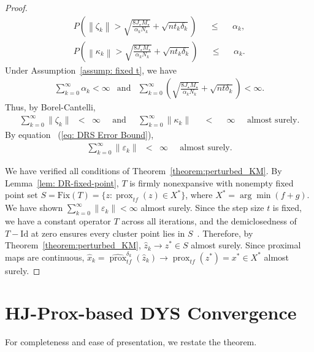 \documentclass{article}
\newcommand{\prox}{\operatorname{prox}}
\newcommand{\amp}{\mathop{\:\:\,}\nolimits}
\theoremstyle{plain}
\theoremstyle{definition}
\theoremstyle{remark}
\begin{document}
\begin{proof}
\begin{eqnarray}
    P\left(\left\|\zeta_k\right\| > \sqrt{\frac{8J_\star M_\star}{\alpha_k N_k}} +\sqrt{nt_k\delta_k}\right) \amp \leq \amp \alpha_k,\\
    P\left(\left\|\kappa_k\right\| > \sqrt{\frac{8J_\star M_\star}{\alpha_k N_k}} +\sqrt{nt_k\delta_k}\right) \amp \leq \amp \alpha_k.
\end{eqnarray}
Under Assumption~\ref{assump: fixed t}, we have
\begin{eqnarray}
    \sum_{k=0}^\infty \alpha_k < \infty &\text{and}& \sum_{k=0}^\infty \left(\sqrt{\frac{8J_\star M_\star}{\alpha_k N_k}}+\sqrt{nt\delta_k}\right)< \infty.
\end{eqnarray}
Thus, by Borel-Cantelli, 
\begin{eqnarray}
\sum_{k=0}^\infty \|\zeta_k\| &<& \infty  \amp\text{and}\amp   \sum_{k=0}^\infty \|\kappa_k\| \amp < \amp \infty  \amp \text{almost surely}.
\end{eqnarray}
By equation ~(\ref{eq: DRS Error Bound}),
\begin{eqnarray}
    \sum_{k=0}^\infty \|\varepsilon_k\| &<& \infty \amp \text{almost surely}.
\end{eqnarray}

We have verified all conditions of Theorem~\ref{theorem:perturbed_KM}. By Lemma~\ref{lem: DR-fixed-point}, $T$ is firmly nonexpansive with nonempty fixed point set $S = \mathrm{Fix}(T) = \{z : \prox_{tf}(z) \in X^*\}$, where $X^* = \arg\min(f+g)$. We have shown $\sum_{k=0}^\infty \|\varepsilon_k\| < \infty$ almost surely. Since the step size $t$ is fixed, we have a constant operator $T$ across all iterations, and the demiclosedness of $T - \mathrm{Id}$ at zero ensures every cluster point lies in $S$~\cite{Combettes2001}. Therefore, by Theorem~\ref{theorem:perturbed_KM}, $\hat{z}_k \to z^* \in S$ almost surely. Since proximal maps are continuous, $\hat{x}_k = \widehat{\prox}_{tf}^{\delta_k}(\hat{z}_k) \to \prox_{tf}(z^*) = x^* \in X^*$ almost surely.
\end{proof}

\section{HJ-Prox-based DYS Convergence}
For completeness and ease of presentation, we restate the theorem.
\end{document}
